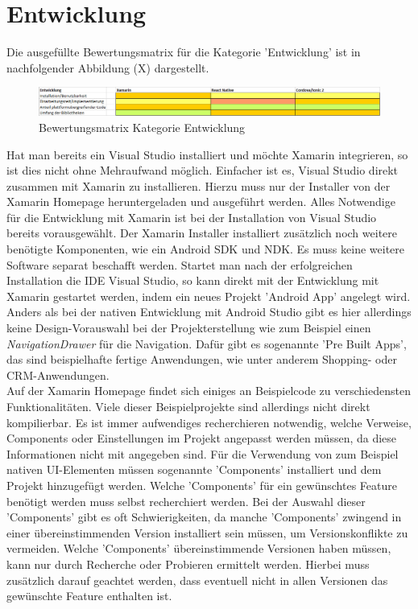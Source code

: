 \section{Entwicklung}

Die ausgefüllte Bewertungsmatrix für die Kategorie 'Entwicklung' ist in nachfolgender Abbildung (X) dargestellt.

\begin{figure}[h]
	\centering
	\includegraphics[width=1\textwidth]{Bilder/Auswertung_Entwicklung.PNG}
	\caption{Bewertungsmatrix Kategorie Entwicklung}
	\label{fig:AuswEntw}
\end{figure}

Hat man bereits ein Visual Studio installiert und möchte Xamarin integrieren, so ist dies nicht ohne Mehraufwand möglich. Einfacher ist es, Visual Studio direkt zusammen mit Xamarin zu installieren. Hierzu muss nur der Installer von der Xamarin Homepage heruntergeladen und ausgeführt werden. Alles Notwendige für die Entwicklung mit Xamarin ist bei der Installation von Visual Studio bereits vorausgewählt. Der Xamarin Installer installiert zusätzlich noch weitere benötigte Komponenten, wie ein Android SDK und NDK. Es muss keine weitere Software separat beschafft werden. Startet man nach der erfolgreichen Installation die IDE Visual Studio, so kann direkt mit der Entwicklung mit Xamarin gestartet werden, indem ein neues Projekt 'Android App' angelegt wird. Anders als bei der nativen Entwicklung mit Android Studio gibt es hier allerdings keine Design-Vorauswahl bei der Projekterstellung wie zum Beispiel einen \textit{NavigationDrawer} für die Navigation. Dafür gibt es sogenannte 'Pre Built Apps', das sind beispielhafte fertige Anwendungen, wie unter anderem Shopping- oder CRM-Anwendungen. 
\\
Auf der Xamarin Homepage findet sich einiges an Beispielcode zu verschiedensten Funktionalitäten. Viele dieser Beispielprojekte sind allerdings nicht direkt kompilierbar. Es ist immer aufwendiges recherchieren notwendig, welche Verweise, Components oder Einstellungen im Projekt angepasst werden müssen, da diese Informationen nicht mit angegeben sind. Für die Verwendung von zum Beispiel nativen UI-Elementen müssen sogenannte 'Components' installiert und dem Projekt hinzugefügt werden. Welche 'Components' für ein gewünschtes Feature benötigt werden muss selbst recherchiert werden. Bei der Auswahl dieser 'Components' gibt es oft Schwierigkeiten, da manche 'Components' zwingend in einer übereinstimmenden Version installiert sein müssen, um Versionskonflikte zu vermeiden. Welche 'Components' übereinstimmende Versionen haben müssen, kann nur durch Recherche oder Probieren ermittelt werden. Hierbei muss zusätzlich darauf geachtet werden, dass eventuell nicht in allen Versionen das gewünschte Feature enthalten ist.
